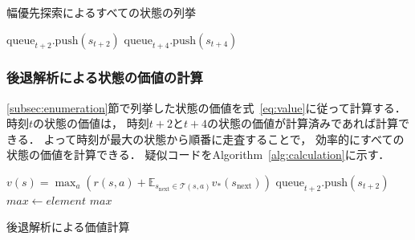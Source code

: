 \begin{algorithm}[tb]
\caption{幅優先探索によるすべての状態の列挙}
\label{alg:bfs}
\begin{algorithmic}[1]
                \State $\text{queue}_{t+2}.\text{push}(s_{t+2})$
            \EndFor
                \State $\text{queue}_{t+4}.\text{push}(s_{t+4})$
            \EndFor
        \EndFor
    \EndFor
\EndFunction
\end{algorithmic}
\end{algorithm}

\subsubsection{後退解析による状態の価値の計算}
\label{subsec:calculation}
\ref{subsec:enumeration}節で列挙した状態の価値を式~\ref{eq:value}に従って計算する．
時刻$t$の状態の価値は， 時刻$t+2$と$t+4$の状態の価値が計算済みであれば計算できる．
よって時刻が最大の状態から順番に走査することで， 効率的にすべての状態の価値を計算できる．
疑似コードをAlgorithm~\ref{alg:calculation}に示す．

\begin{algorithm}[tb]
    \begin{algorithmic}[1]

            \State $v(s) = \max_a \left(r(s,a) + \mathbb{E}_{s_\text{next} \in \mathcal{T}(s,a)} v_*(s_\text{next}) \right)$
        \EndFor
                \State $\text{queue}_{t+2}.\text{push}(s_{t+2})$
            \EndFor
                \State $max \gets element$
            \EndIf
        \EndFor
        \State \Return $max$
    \EndFunction
    \end{algorithmic}
    \caption{後退解析による価値計算}
    \label{alg:calculation}
\end{algorithm}

